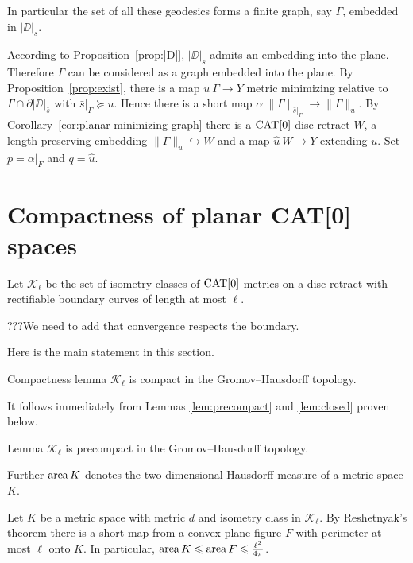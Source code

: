 \documentclass{article}
\begin{document}

In particular the set of all these geodesics forms a finite graph, say $\Gamma$,
embedded in $|\DD|_s$. 

According to Proposition~\ref{prop:|D|},
$|\DD|_s$ admits an embedding into the plane.
Therefore $\Gamma$ can be considered as a graph embedded into the plane.
By Proposition~\ref{prop:exist}, there is a map $u\:\Gamma\to Y$ metric minimizing relative to $\Gamma\cap\partial|\DD|_{\bar s}$ with
$\bar s|_\Gamma\succcurlyeq u$.
Hence there is a short map $\alpha\:\|\Gamma\|_{\bar s|_\Gamma}\to\|\Gamma\|_u$. 
By Corollary~\ref{cor:planar-minimizing-graph} there is a $\mathop{\rm CAT}\nolimits[0]$ disc retract $W$, a length preserving embedding
$\|\Gamma\|_u\hookrightarrow W$ and a map $\hat u\:W\to Y$ extending $\bar u$. %
Set $p=\alpha|_F$ and $q=\hat u$.
\qeds


\section{Compactness of planar CAT[0] spaces}\label{Compactness}

Let $\mathcal{K}_\ell$ be the set of isometry classes of $\mathop{\rm CAT}\nolimits[0]$ metrics on a disc retract with rectifiable
boundary curves of length at most $\ell$.

???We need to add that convergence respects the boundary.


Here is the main statement in this section.

\begin{thm}{Compactness lemma}\label{lem:compact}
$\mathcal{K}_\ell$ is compact in the Gromov--Hausdorff topology.
\end{thm}

It follows immediately from Lemmas \ref{lem:precompact} and \ref{lem:closed} proven below.

\begin{thm}{Lemma}\label{lem:precompact}
$\mathcal{K}_\ell$ is precompact in the Gromov--Hausdorff topology.
\end{thm}

Further $\mathop{\rm area}\nolimits K$ denotes the two-dimensional Hausdorff measure of a metric space $K$. 

Let $K$ be a metric space with metric $d$ and isometry class in $\mathcal {K}_\ell$.
By Reshetnyak's theorem there is a short map from a convex plane figure $F$ with perimeter at most $\ell$ onto $K$.
In particular, $\mathop{\rm area}\nolimits K \leqslant \mathop{\rm area}\nolimits F \leqslant \tfrac{\ell^2}{4\pi}$.
\end{document}
